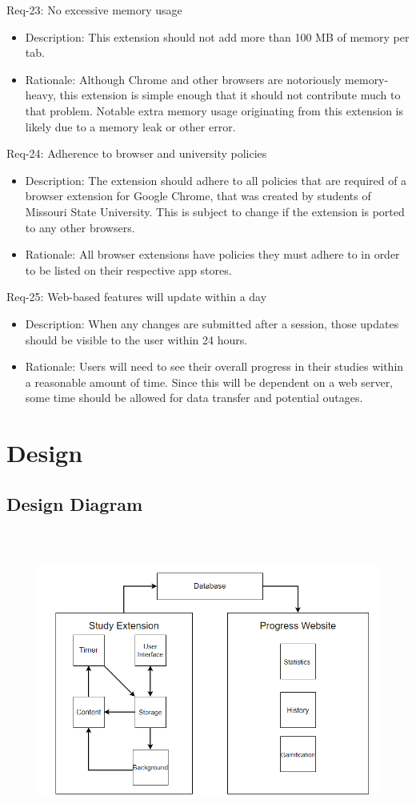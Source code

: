 \documentclass[12pt]{article}
\begin{document}
Req-23:  No excessive memory usage
\begin{itemize}
    \item Description: This extension should not add more than 100 MB of memory per tab.
    \item Rationale: Although Chrome and other browsers are notoriously memory-heavy, this extension is simple enough that it should not contribute much to that problem. Notable extra memory usage originating from this extension is likely due to a memory leak or other error.
\end{itemize}
Req-24: Adherence to browser and university policies
\begin{itemize}
    \item Description: The extension should adhere to all policies that are required of a browser extension for Google Chrome, that was created by students of Missouri State University. This is subject to change if the extension is ported to any other browsers.
    \item Rationale: All browser extensions have policies they must adhere to in order to be listed on their respective app stores.
\end{itemize}
Req-25: Web-based features will update within a day
\begin{itemize}
    \item Description: When any changes are submitted after a session, those updates should be visible to the user within 24 hours.
    \item Rationale: Users will need to see their overall progress in their studies within a reasonable amount of time. Since this will be dependent on a web server, some time should be allowed for data transfer and potential outages.
\end{itemize}

\pagebreak
\section{Design}
\subsection{Design Diagram}
\begin{figure}[h]
\includegraphics[width=15.0cm, height=10.0cm]{images/Design.png}
\end{figure}
\end{document}
